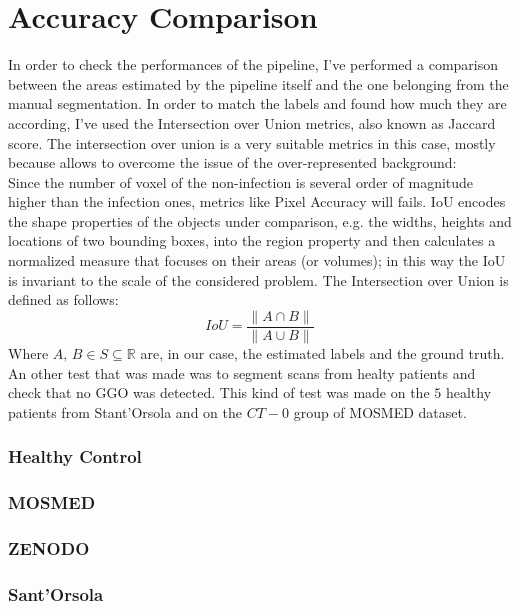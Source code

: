 \documentclass{standalone}
\begin{document}
	\section{Accuracy Comparison}	
	
	In order to check the performances of the pipeline, I've performed a comparison between the areas estimated by the pipeline itself and the one belonging from the manual segmentation. In order to match the labels and found how much they are according, I've used the Intersection over Union metrics, also known as Jaccard score. The intersection over union is a very suitable metrics in this case, mostly because allows  to overcome the issue of the over-represented background:\\
	Since the number of voxel of the non-infection is several order of magnitude higher than the infection ones, metrics like Pixel Accuracy will fails.
	IoU encodes the shape properties of the objects under comparison, e.g. the widths, heights and locations of two bounding boxes, into the region property and then calculates a normalized measure that focuses on their areas (or volumes); in this way the IoU is invariant to the scale of the considered problem. 
	The Intersection over Union is defined as follows: 
	\begin{equation*}
		IoU = \frac{\|A \cap B \|}{\| A \cup B \|}
	\end{equation*}
	Where $A,\, B\in S\subseteq\mathbb{R}$ are, in our case, the estimated labels and the ground truth.\\

	An other test that was made was to segment scans from healty patients and check that no GGO was detected. This kind of test was made on the $5$ healthy patients from Stant'Orsola and on the $CT-0$ group of MOSMED dataset.\\
	
	\subsubsection*{Healthy Control}
	
	\subsubsection*{MOSMED}
	
	\subsubsection*{ZENODO}
	
	\subsubsection*{Sant'Orsola}
\end{document}
